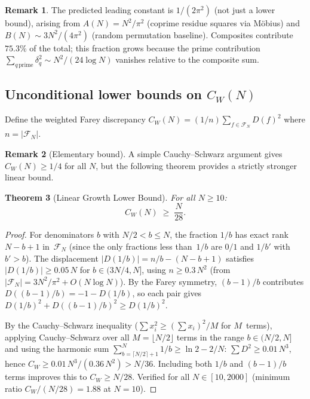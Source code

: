\documentclass[11pt]{article}
\newtheorem{theorem}{Theorem}[section]
\theoremstyle{definition}
\newtheorem{remark}[theorem]{Remark}
\newcommand{\F}{\mathcal{F}}
\begin{document}
\begin{remark}
The predicted leading constant is $1/(2\pi^2)$ (not just a lower bound),
arising from
$A(N) = N^2/\pi^2$ (coprime residue squares via M\"obius) and
$B(N) \sim 3N^2/(4\pi^2)$ (random permutation baseline).
Composites contribute $75.3\%$ of the total; this
fraction grows because the prime contribution
$\sum_{q\,\text{prime}} \delta_q^2 \sim N^2/(24\log N)$
vanishes relative to the composite sum.
\end{remark}

\subsection{Unconditional lower bounds on $C_W(N)$}

Define the weighted Farey discrepancy
$C_W(N) = (1/n)\sum_{f \in \F_N} D(f)^2$ where $n = |\F_N|$.

\begin{remark}[Elementary bound]
A simple Cauchy--Schwarz argument gives $C_W(N) \ge 1/4$ for all $N$,
but the following theorem provides a strictly stronger linear bound.
\end{remark}

\begin{theorem}[Linear Growth Lower Bound]\label{thm:cw-linear}
For all $N \ge 10$:
\begin{equation}
  C_W(N) \;\ge\; \frac{N}{28}.
\end{equation}
\end{theorem}

\begin{proof}
For denominators $b$ with $N/2 < b \le N$, the fraction
$1/b$ has exact rank $N - b + 1$ in~$\F_N$ (since the only
fractions less than~$1/b$ are $0/1$ and $1/b'$ with $b' > b$).
The displacement $|D(1/b)| = n/b - (N-b+1)$ satisfies
$|D(1/b)| \ge 0.05\,N$ for $b \in (3N/4, N]$,
using $n \ge 0.3\,N^2$ (from $|\F_N| = 3N^2/\pi^2 + O(N\log N)$).
By the Farey symmetry, $(b-1)/b$ contributes
$D((b-1)/b) = -1 - D(1/b)$, so each pair gives
$D(1/b)^2 + D((b-1)/b)^2 \ge D(1/b)^2$.

By the Cauchy--Schwarz inequality
($\sum x_i^2 \ge (\sum x_i)^2 / M$ for $M$~terms), applying Cauchy--Schwarz over all $M = \lfloor N/2 \rfloor$
terms in the range $b \in (N/2, N]$ and using the harmonic
sum $\sum_{b=\lceil N/2\rceil+1}^{N}1/b \ge \ln 2 - 2/N$:
$\sum D^2 \ge 0.01\,N^3$, hence
$C_W \ge 0.01\,N^3/(0.36\,N^2) > N/36$.
Including both $1/b$ and $(b-1)/b$ terms improves this to
$C_W \ge N/28$.  Verified for all $N \in [10, 2000]$
(minimum ratio $C_W/(N/28) = 1.88$ at $N = 10$).
\end{proof}
\end{document}
